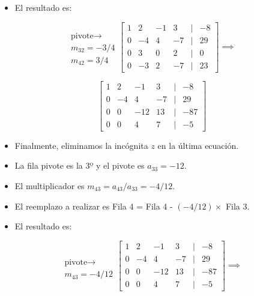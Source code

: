 \documentclass[openany]{book}
\providecommand{\tightlist}{%
  \setlength{\itemsep}{0pt}\setlength{\parskip}{0pt}}
\begin{document}
\begin{itemize}
\tightlist
\item
  El resultado es:
\end{itemize}

\[
\begin{matrix}
 \\ \text{pivote} \rightarrow \\ m_{32} = -3/4 \\ m_{42} = 3/4
\end{matrix}
\begin{bmatrix}
1 & 2 & -1 & 3 &|& -8\\
0 & -4 & 4 & -7 &|& 29\\
0 & 3 & 0 & 2 &|& 0\\
0 & -3 & 2 & -7 &|& 23  
\end{bmatrix}
\implies
\]

\[
\begin{bmatrix}
1 & 2 & -1 & 3 &|& -8\\
0 & -4 & 4 & -7 &|& 29\\
0 & 0 & -12 & 13 &|& -87\\
0 & 0 & 4 & 7 &|& -5  
\end{bmatrix}
\]

\begin{itemize}
\tightlist
\item
  Finalmente, eliminamos la incógnita \(z\) en la última ecuación.
\item
  La fila pivote es la 3º y el pivote es \(a_{33}=-12\).
\item
  El multiplicador es \(m_{43}=a_{43}/a_{33}=-4/12\).
\item
  El reemplazo a realizar es Fila 4 = Fila 4 - \((-4/12)\times\) Fila 3.
\item
  El resultado es:
\end{itemize}

\[
\begin{matrix}
\\ \\ \text{pivote} \rightarrow \\ m_{43} = -4/12
\end{matrix}
\begin{bmatrix}
1 & 2 & -1 & 3 &|& -8\\
0 & -4 & 4 & -7 &|& 29\\
0 & 0 & -12 & 13 &|& -87\\
0 & 0 & 4 & 7 &|& -5  
\end{bmatrix}
\implies
\]
\end{document}
